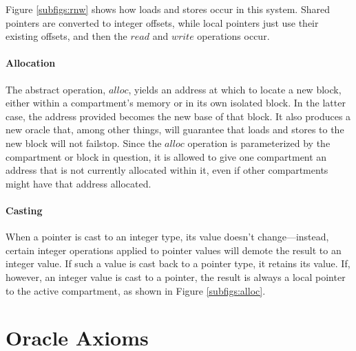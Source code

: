 \documentclass{article}
\begin{document}
Figure \ref{subfigs:rnw} shows how loads and stores occur in this system. Shared pointers
are converted to integer offsets, while local pointers just use their existing offsets,
and then the \(\mathit{read}\) and \(\mathit{write}\) operations occur.

\paragraph{Allocation}

The abstract operation, \(\mathit{alloc}\), yields an address at which to locate a new
block, either within a compartment's memory or in its own isolated block. In the latter
case, the address provided becomes the new base of that block. It also produces a new
oracle that, among other things, will guarantee that loads and stores to the new block will
not failstop. Since the \(\mathit{alloc}\) operation is parameterized by the compartment
or block in question, it is allowed to give one compartment an address that is not currently
allocated within it, even if other compartments might have that address allocated.

\paragraph{Casting}

When a pointer is cast to an integer type, its value doesn't change---instead, certain
integer operations applied to pointer values will demote the result to an integer value.
If such a value is cast back to a pointer type, it retains its value. If, however, an
integer value is cast to a pointer, the result is always a local pointer to the active compartment,
as shown in Figure \ref{subfigs:alloc}.

\section{Oracle Axioms}
\end{document}
